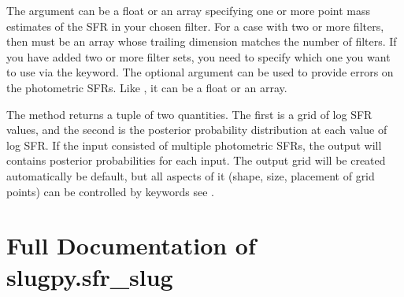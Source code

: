 \documentclass[letterpaper,10pt,english]{sphinxmanual}
\begin{document}
The argument  can be a float or an array specifying one or more point mass estimates of the SFR in your chosen filter. For a case with two or more filters, then  must be an array whose trailing dimension matches the number of filters. If you have added two or more filter sets, you need to specify which one you want to use via the  keyword. The optional argument  can be used to provide errors on the photometric SFRs. Like , it can be a float or an array.

The  method returns a tuple of two quantities. The first is a grid of log SFR values, and the second is the posterior probability distribution at each value of log SFR. If the input consisted of multiple photometric SFRs, the output will contains posterior probabilities for each input. The output grid will be created automatically be default, but all aspects of it (shape, size, placement of grid points) can be controlled by keywords \textendash{} see {\hyperref[\detokenize{sfr_slug:sec-sfr-slug-full}]{}}.


\section{Full Documentation of slugpy.sfr\_slug}
\label{\detokenize{sfr_slug:sec-sfr-slug-full}}\label{\detokenize{sfr_slug:full-documentation-of-slugpy-sfr-slug}}
\end{document}
